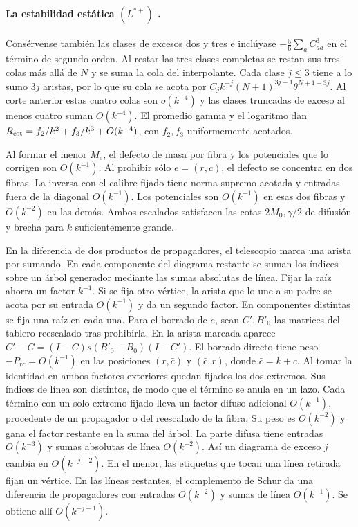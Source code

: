\paragraph{La estabilidad estática $(L^{*+})$ .}
Consérvense también las clases de excesos dos y tres e inclúyase $-\frac56\sum_a C_{aa}^3$ en
el término de segundo orden. Al restar las tres clases completas se restan sus tres colas más
allá de $N$ y se suma la cola del interpolante. Cada clase $j\le3$ tiene a lo sumo $3j$ aristas,
por lo que su cola se acota por $C_j k^{-j}(N+1)^{3j-1}\theta^{N+1-3j}$. Al corte anterior
estas cuatro colas son $o(k^{-4})$ y las clases truncadas de exceso al menos cuatro suman
$O(k^{-4})$. El promedio gamma y el logaritmo dan $R_{\rm est}=f_2/k^2+f_3/k^3+O(k^{-4})$,
con $f_2,f_3$ uniformemente acotados.

Al formar el menor $M_e$, el defecto de masa por fibra y los potenciales que lo corrigen son
$O(k^{-1})$. Al prohibir sólo $e=(r,c)$, el defecto se concentra en dos fibras. La inversa
con el calibre fijado tiene norma supremo acotada y entradas fuera de la diagonal $O(k^{-1})$.
Los potenciales son $O(k^{-1})$ en esas dos fibras y $O(k^{-2})$ en las demás. Ambos escalados
satisfacen las cotas $2M_0,\gamma/2$ de difusión y brecha para $k$ suficientemente grande.

En la diferencia de dos productos de propagadores, el telescopio marca una arista por sumando.
En cada componente del diagrama restante se suman los índices sobre un árbol generador mediante
las sumas absolutas de línea. Fijar la raíz ahorra un factor $k^{-1}$. Si se fija otro vértice,
la arista que lo une a su padre se acota por su entrada $O(k^{-1})$ y da un segundo factor.
En componentes distintas se fija una raíz en cada una. Para el borrado de $e$, sean $C',B'_0$
las matrices del tablero reescalado tras prohibirla. En la arista marcada aparece
$C'-C=(I-C)s(B'_0-B_0)(I-C')$. El borrado directo tiene peso $-P_{rc}=O(k^{-1})$
en las posiciones $(r,\bar c)$ y $(\bar c,r)$, donde $\bar c=k+c$. Al tomar la identidad
en ambos factores exteriores quedan fijados los dos extremos. Sus índices de línea son distintos,
de modo que el término se anula en un lazo. Cada término con un solo extremo fijado lleva
un factor difuso adicional $O(k^{-1})$, procedente de un propagador o del reescalado de la fibra.
Su peso es $O(k^{-2})$ y gana el factor restante en la suma del árbol. La parte difusa tiene
entradas $O(k^{-3})$ y sumas absolutas de línea $O(k^{-2})$. Así un diagrama de exceso $j$
cambia en $O(k^{-j-2})$. En el menor, las etiquetas que tocan una línea retirada fijan un
vértice. En las líneas restantes, el complemento de Schur da una diferencia de propagadores con
entradas $O(k^{-2})$ y sumas de línea $O(k^{-1})$. Se obtiene allí $O(k^{-j-1})$.

